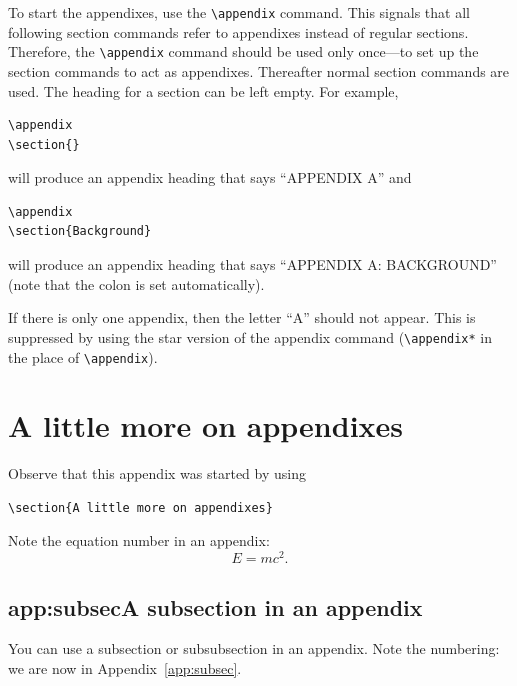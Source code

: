 \documentclass[%
 aip,
 jmp,%
 amsmath,amssymb,
 reprint,%
]{revtex4-1}
\begin{document}
To start the appendixes, use the \verb+\appendix+ command.
This signals that all following section commands refer to appendixes
instead of regular sections. Therefore, the \verb+\appendix+ command
should be used only once---to set up the section commands to act as
appendixes. Thereafter normal section commands are used. The heading
for a section can be left empty. For example,
\begin{verbatim}
\appendix
\section{}
\end{verbatim}
will produce an appendix heading that says ``APPENDIX A'' and
\begin{verbatim}
\appendix
\section{Background}
\end{verbatim}
will produce an appendix heading that says ``APPENDIX A: BACKGROUND''
(note that the colon is set automatically).

If there is only one appendix, then the letter ``A'' should not
appear. This is suppressed by using the star version of the appendix
command (\verb+\appendix*+ in the place of \verb+\appendix+).

\section{A little more on appendixes}

Observe that this appendix was started by using
\begin{verbatim}
\section{A little more on appendixes}
\end{verbatim}

Note the equation number in an appendix:
\begin{equation}
E=mc^2.
\end{equation}

\subsection{{app:subsec}A subsection in an appendix}

You can use a subsection or subsubsection in an appendix. Note the
numbering: we are now in Appendix~\ref{app:subsec}.
\end{document}
